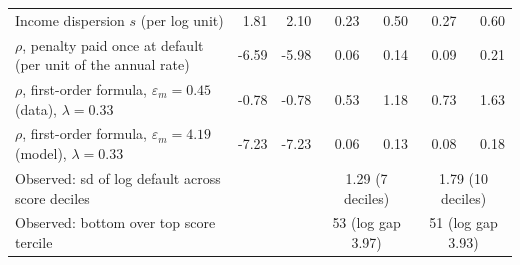 \begin{tabular}{lrrrrrr}
Income dispersion $s$ (per log unit) & 1.81 & 2.10 & 0.23 & 0.50 & 0.27 & 0.60 \\
$\rho$, penalty paid once at default (per unit of the annual rate) & -6.59 & -5.98 & 0.06 & 0.14 & 0.09 & 0.21 \\
$\rho$, first-order formula, $\varepsilon_m = 0.45$ (data), $\lambda = 0.33$ & -0.78 & -0.78 & 0.53 & 1.18 & 0.73 & 1.63 \\
$\rho$, first-order formula, $\varepsilon_m = 4.19$ (model), $\lambda = 0.33$ & -7.23 & -7.23 & 0.06 & 0.13 & 0.08 & 0.18 \\
\midrule
Observed: sd of log default across score deciles & & & \multicolumn{2}{c}{1.29 (7 deciles)} & \multicolumn{2}{c}{1.79 (10 deciles)} \\
Observed: bottom over top score tercile & & & \multicolumn{2}{c}{53 (log gap 3.97)} & \multicolumn{2}{c}{51 (log gap 3.93)} \\
\bottomrule
\end{tabular}
